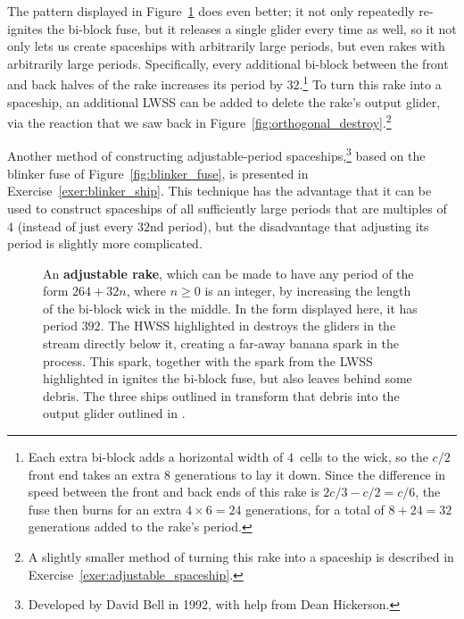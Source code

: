 The pattern displayed in Figure~\ref{fig:adjustable_rake} does even better; it not only repeatedly re-ignites the bi-block fuse, but it releases a single glider every time as well, so it not only lets us create spaceships with arbitrarily large periods, but even rakes with arbitrarily large periods. Specifically, every additional bi-block between the front and back halves of the rake increases its period by $32$.\footnote{Each extra bi-block adds a horizontal width of $4$~cells to the wick, so the $c/2$ front end takes an extra $8$ generations to lay it down. Since the difference in speed between the front and back ends of this rake is $2c/3 - c/2 = c/6$, the fuse then burns for an extra $4 \times 6 = 24$ generations, for a total of $8 + 24 = 32$ generations added to the rake's period.} To turn this rake into a spaceship, an additional LWSS can be added to delete the rake's output glider, via the reaction that we saw back in Figure~\ref{fig:orthogonal_destroy}.\footnote{A slightly smaller method of turning this rake into a spaceship is described in Exercise~\ref{exer:adjustable_spaceship}.}

Another method of constructing adjustable-period spaceships,\footnote{Developed by David Bell in 1992, with help from Dean Hickerson.} based on the blinker fuse of Figure~\ref{fig:blinker_fuse}, is presented in Exercise~\ref{exer:blinker_ship}. This technique has the advantage that it can be used to construct spaceships of all sufficiently large periods that are multiples of $4$ (instead of just every $32$nd period), but the disadvantage that adjusting its period is slightly more complicated.

\begin{figure}[!htb]
	\centering
	\caption{An \textbf{adjustable rake}, which can be made to have any period of the form $264 + 32n$, where $n \geq 0$ is an integer, by increasing the length of the bi-block wick in the middle. In the form displayed here, it has period $392$. The HWSS highlighted in  destroys the gliders in the stream directly below it, creating a far-away banana spark in the process. This spark, together with the spark from the LWSS highlighted in  ignites the bi-block fuse, but also leaves behind some debris. The three ships outlined in  transform that debris into the output glider outlined in .}
	\label{fig:adjustable_rake}
\end{figure}


